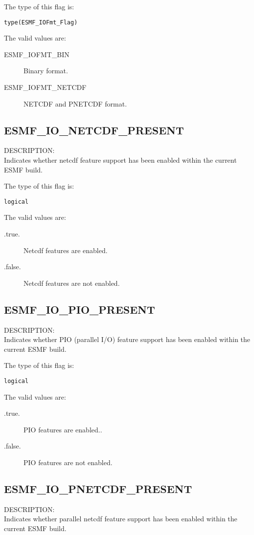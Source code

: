 The type of this flag is:

{\tt type(ESMF\_IOFmt\_Flag)}

The valid values are:
\begin{description}
\item [ESMF\_IOFMT\_BIN]
      Binary format.
\item [ESMF\_IOFMT\_NETCDF]
      NETCDF and PNETCDF format.
\end{description}

\subsection{ESMF\_IO\_NETCDF\_PRESENT}
\label{const:ionetcdfflag}
{\sf DESCRIPTION:\\}
Indicates whether netcdf feature support has been enabled
within the current ESMF build.

The type of this flag is:

{\tt logical}

The valid values are:
\begin{description}
\item [.true.]
      Netcdf features are enabled.
\item [.false.]
      Netcdf features are not enabled.
\end{description}

\subsection{ESMF\_IO\_PIO\_PRESENT}
\label{const:iopioflag}
{\sf DESCRIPTION:\\}
Indicates whether PIO (parallel I/O) feature support has been enabled
within the current ESMF build.

The type of this flag is:

{\tt logical}

The valid values are:
\begin{description}
 \item [.true.]
      PIO features are enabled..
\item [.false.]
      PIO  features are not enabled.
\end{description}

\subsection{ESMF\_IO\_PNETCDF\_PRESENT}
\label{const:iopnetcdfflag}
{\sf DESCRIPTION:\\}
Indicates whether parallel netcdf feature support has been enabled
within the current ESMF build.

